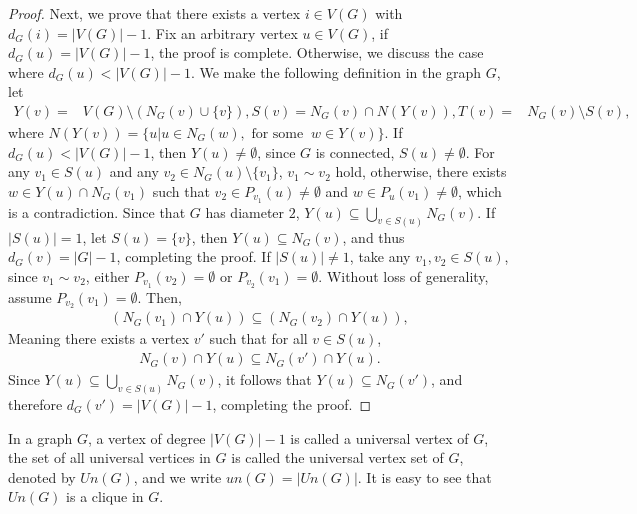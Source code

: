 \documentclass[preprint,12pt]{elsarticle}
\begin{document}
\begin{proof}
                Next, we prove that there exists a vertex $i \in V(G)$ with $d_{G}(i)=|V(G)|-1$. Fix an arbitrary vertex $u \in V(G)$, if $d_{G}(u)=|V(G)|-1$, the proof is complete. Otherwise, we discuss the case where $d_{G}(u) < |V(G)|-1$. We make the following definition in the graph $G$, let
                    \begin{align*}
                         Y(v)=& V(G) \setminus (N_{G}(v) \cup \{v\}), S(v) = N_{G}(v)\cap N(Y(v)), T(v) =& N_{G}(v)\setminus S(v),
			        \end{align*}
                where $N(Y(v))=\{u|u \in N_{G}(w), \text{ for some } \ w \in Y(v)\}$.
                If $d_{G}(u) < |V(G)|-1$, then $Y(u) \neq \emptyset$, since $G$ is connected, $S(u) \neq \emptyset$. For any $v_1 \in S(u)$ and any $v_2 \in N_{G}(u)\setminus\{v_1\}$, $v_1 \sim v_2$ hold, otherwise, there exists $w \in Y(u)\cap N_{G}(v_1)$ such that $v_2 \in P_{v_1}(u) \neq \emptyset$ and $w \in P_u(v_1) \neq \emptyset$, which is a contradiction.
                Since that $G$ has diameter $2$, $Y(u) \subseteq \bigcup_{v \in S(u)} N_{G}(v)$. If $|S(u)|=1$, let $S(u)=\{v\}$, then $Y(u) \subseteq N_{G}(v)$, and thus $d_{G}(v)=|G|-1$, completing the proof. If $|S(u)| \neq 1$, take any $v_1, v_2 \in S(u)$, since $v_1 \sim v_2$, either $P_{v_1}(v_2)=\emptyset$ or $P_{v_2}(v_1)=\emptyset$. Without loss of generality, assume $P_{v_2}(v_1)=\emptyset$. Then,
                    \begin{align*}
                        (N_{G}(v_1) \cap Y(u)) \subseteq (N_{G}(v_2) \cap Y(u)),
			        \end{align*}
                 Meaning there exists a vertex $v'$ such that for all $v \in S(u)$,
                    \begin{align*}
                        N_{G}(v) \cap Y(u) \subseteq N_{G}(v') \cap Y(u).
			        \end{align*}
                Since $Y(u) \subseteq \bigcup_{v \in S(u)} N_{G}(v)$, it follows that $Y(u) \subseteq N_{G}(v')$, and therefore $d_{G}(v')=|V(G)|-1$, completing the proof.




        \end{proof}


        In a graph $G$, a vertex of degree $|V(G)| - 1$ is called a universal vertex of $G$, the set of all universal vertices in $G$ is called the universal vertex set of $G$, denoted by $Un(G)$, and we write $un(G) = |Un(G)|$. It is easy to see that $Un(G)$ is a clique in $G$.
\end{document}
